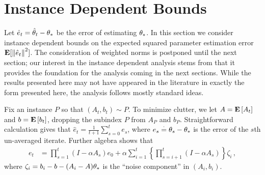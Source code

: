 \section{Instance Dependent Bounds}\label{sec:mainresults}
Let $\hat e_t = \hat \theta_t - \theta_*$ be the error of estimating $\theta_*$.
In this section we consider instance dependent bounds on the expected squared parameter estimation error $\mathbf{E}[ \left\| \hat e_t\right\|^2 ]$. 
The consideration of weighted norms is postponed until the next section;
our interest in the instance dependent analysis stems from that it 
provides the foundation for the analysis coming in the next sections. 
While the results presented here may not have appeared in the literature in exactly the form presented here, the analysis follows mostly standard ideas. 
\iffalse
The core question is how the error depends on various instance-dependent quantities (variance of noise, spectral properties of matrices involved, the size of the initial error, etc.), how fast the error decreased over time.
As we shall see, if the constant step-size belongs to a small enough neighborhood of zero (the size of which depends on the instance), the error decreases at a rate of $O(1/t)$ and both too small and too large step-sizes are undesirable. The main result, \Cref{th:rate}, which bounds the error from above, is corroborated with a lower bound which shows that the upper bound is tight.
While the results of this section may not have appeared in this form in the literature, the steps of the analysis are quite standard. \todoc{I think we should say who we are building on.}
\fi

\iffalse
We first show that any  CALSA scheme  achieves an error of size$O(\frac{1}{t})$ with instance dependent constants and
step-size (see \Cref{th:rate}). In the \Cref{sec:land,sec:rl}, we investigate conditions under which this instance dependence can be eliminated such that we have \emph{universal} step-size choice and \emph{uniform} rates.
As a first step, we need show that there exists an instance dependent step-size such that the iterates are stable. To this end, it is useful to look at the error (of un-averaged iterates) $e_t\eqdef\theta_t-\ts$ given as below:
\fi
Fix an instance $P$ so that $(A_t,b_t)\sim P$. To minimize clutter, 
we let $A = \mathbf{E}\left[A_t\right]$ and $b = \mathbf{E}\left[b_t\right]$,
dropping the subindex $P$ from $A_P$ and $b_P$.
Straightforward calculation gives that $\hat e_t = \frac1{t+1} \sum_{s=0}^t e_s$, where
 $e_s\stackrel{\cdot}{=}\theta_s-\theta_*$ is the error of the $s$th un-averaged iterate. Further algebra shows that \begin{align}\label{eq:errrecmain}
e_t&={\prod_{s=1}^t \! (I-\alpha A_s) e_0}+\alpha{\sum_{i=1}^t\! \left\{\prod_{s=i+1}^t \!(I-\alpha A_s)\!\right\}\!\zeta_i}\,,
\end{align}
where $\zeta_i = b_i-b - (A_i -A)\theta_*$ is the ``noise component'' in $(A_i,b_i)$.

